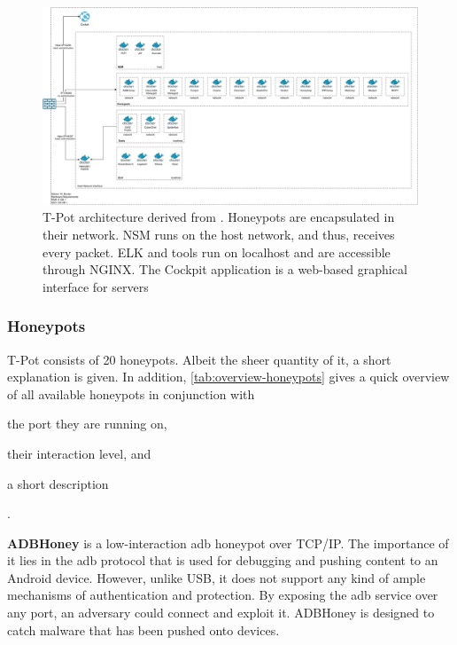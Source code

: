 \begin{figure}
    \centering
    \includegraphics[width=\textwidth]{figures/tpot-architecture.pdf}
    \caption[T-Pot architecture]{
        T-Pot architecture derived from \cite{tpot2021}.
        Honeypots are encapsulated in their network.
        NSM runs on the host network, and thus, receives every packet.
        ELK and tools run on localhost and are accessible through NGINX.
        The Cockpit application is a web-based graphical interface for servers
    }
    \label{fig:overview-tpot}
\end{figure}

\subsubsection{Honeypots}

T-Pot consists of 20 honeypots.
Albeit the sheer quantity of it, a short explanation is given.
In addition, \autoref{tab:overview-honeypots} gives a quick overview of all available honeypots in conjunction with
\begin{enumerate*}[label=(\roman*)]
    \item the port they are running on,
    \item their interaction level, and
    \item a short description
\end{enumerate*}.

\textbf{ADBHoney} \cite{adbhoney2021} is a low-interaction \ac{adb} honeypot over TCP/IP.
The importance of it lies in the \ac{adb} protocol that is used for debugging and pushing content to an Android device.
However, unlike USB, it does not support any kind of ample mechanisms of authentication and protection.
By exposing the \ac{adb} service over any port, an adversary could connect and exploit it.
ADBHoney is designed to catch malware that has been pushed onto devices.

